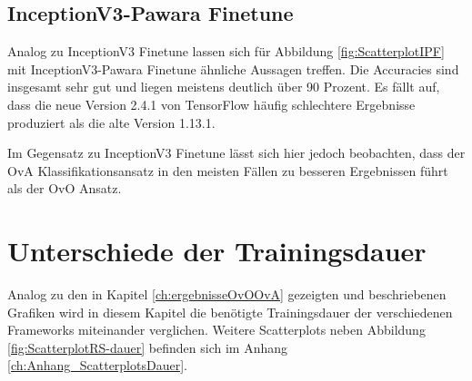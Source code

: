 \subsection{InceptionV3-Pawara Finetune}
Analog zu InceptionV3 Finetune lassen sich für Abbildung \ref{fig:ScatterplotIPF} mit InceptionV3-Pawara Finetune ähnliche Aussagen treffen. Die Accuracies sind insgesamt sehr gut und liegen meistens deutlich über 90 Prozent.
Es fällt auf, dass die neue Version 2.4.1 von TensorFlow \cite{tensorflow} häufig schlechtere Ergebnisse produziert als die alte Version 1.13.1.

Im Gegensatz zu InceptionV3 Finetune lässt sich hier jedoch beobachten, dass der OvA Klassifikationsansatz in den meisten Fällen zu besseren Ergebnissen führt als der OvO Ansatz.




\section{Unterschiede der Trainingsdauer}
\label{ch:ergebnisseOvOOvA-Dauer}
Analog zu den in Kapitel \ref{ch:ergebnisseOvOOvA} gezeigten und beschriebenen Grafiken wird in diesem Kapitel die benötigte Trainingsdauer der verschiedenen Frameworks miteinander verglichen. Weitere Scatterplots neben Abbildung \ref{fig:ScatterplotRS-dauer} befinden sich im Anhang \ref{ch:Anhang_ScatterplotsDauer}.\\

